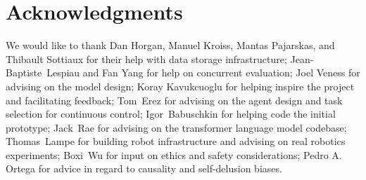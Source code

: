 \documentclass[10pt]{article} \usepackage[accepted]{tmlr}
\begin{document}
\newpage
\section*{Acknowledgments}
We would like to thank Dan Horgan, Manuel Kroiss, Mantas Pajarskas, and Thibault Sottiaux for their help with data storage infrastructure; Jean-Baptiste~Lespiau and Fan Yang for help on concurrent evaluation; Joel Veness for advising on the model design; Koray Kavukcuoglu for helping inspire the project and facilitating feedback; Tom~Erez for advising on the agent design and task selection for continuous control; Igor~Babuschkin for helping code the initial prototype;  Jack~Rae for advising on the transformer language model codebase; Thomas~Lampe for building robot infrastructure and advising on real robotics experiments; Boxi~Wu for input on ethics and safety considerations; Pedro A. Ortega for advice in regard to causality and self-delusion biases.
\end{document}
